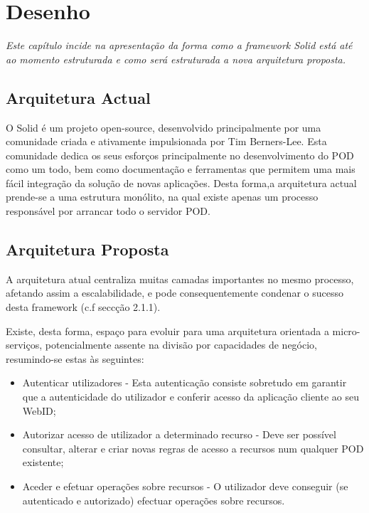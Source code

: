 
\chapter{Desenho}
\label{cap:4}
\emph{Este capítulo incide na apresentação da forma como a framework Solid está até ao momento estruturada e como será estruturada a nova arquitetura proposta.}

\section{Arquitetura Actual}

O Solid é um projeto open-source, desenvolvido principalmente por uma comunidade criada e ativamente impulsionada por Tim Berners-Lee. Esta comunidade dedica os seus esforços principalmente no desenvolvimento do POD como um todo, bem como documentação e ferramentas que permitem uma mais fácil integração da solução de novas aplicações. Desta forma,a arquitetura actual prende-se a uma estrutura monólito, na qual existe apenas um processo responsável por arrancar todo o servidor POD.

\section{Arquitetura Proposta}
A arquitetura atual centraliza muitas camadas importantes no mesmo processo, afetando assim a escalabilidade, e pode consequentemente condenar o sucesso desta framework (c.f seccção 2.1.1).

Existe, desta forma, espaço para evoluir para uma arquitetura orientada a micro-serviços, potencialmente assente na divisão por capacidades de negócio, resumindo-se estas às seguintes:
\begin{itemize}
    \item  Autenticar utilizadores - Esta autenticação consiste sobretudo em garantir que a autenticidade do utilizador e conferir acesso da aplicação cliente ao seu WebID;
    \item Autorizar acesso de utilizador a determinado recurso - Deve ser possível consultar, alterar e criar novas regras de acesso a recursos num qualquer POD existente;
    \item Aceder e efetuar operações sobre recursos - O utilizador deve conseguir (se autenticado e autorizado) efectuar operações sobre recursos.
\end{itemize}

